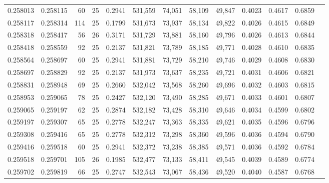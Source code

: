 \begin{tabular}{rrrrrrrrrrrrr}
0.258013 & 0.258115 &    60 &  25 &                                     0.2941 & 531,559 &  74,051 &  58,109 &  49,847 & 0.4023 & 0.4617 & 0.6859 \\
0.258117 & 0.258314 &   114 &  25 &                                     0.1799 & 531,673 &  73,937 &  58,134 &  49,822 & 0.4026 & 0.4615 & 0.6849 \\
0.258318 & 0.258417 &    56 &  26 &                                     0.3171 & 531,729 &  73,881 &  58,160 &  49,796 & 0.4026 & 0.4613 & 0.6844 \\
0.258418 & 0.258559 &    92 &  25 &                                     0.2137 & 531,821 &  73,789 &  58,185 &  49,771 & 0.4028 & 0.4610 & 0.6835 \\
0.258564 & 0.258697 &    60 &  25 &                                     0.2941 & 531,881 &  73,729 &  58,210 &  49,746 & 0.4029 & 0.4608 & 0.6830 \\
0.258697 & 0.258829 &    92 &  25 &                                     0.2137 & 531,973 &  73,637 &  58,235 &  49,721 & 0.4031 & 0.4606 & 0.6821 \\
0.258831 & 0.258948 &    69 &  25 &                                     0.2660 & 532,042 &  73,568 &  58,260 &  49,696 & 0.4032 & 0.4603 & 0.6815 \\
0.258953 & 0.259065 &    78 &  25 &                                     0.2427 & 532,120 &  73,490 &  58,285 &  49,671 & 0.4033 & 0.4601 & 0.6807 \\
0.259065 & 0.259197 &    62 &  25 &                                     0.2874 & 532,182 &  73,428 &  58,310 &  49,646 & 0.4034 & 0.4599 & 0.6802 \\
0.259197 & 0.259307 &    65 &  25 &                                     0.2778 & 532,247 &  73,363 &  58,335 &  49,621 & 0.4035 & 0.4596 & 0.6796 \\
0.259308 & 0.259416 &    65 &  25 &                                     0.2778 & 532,312 &  73,298 &  58,360 &  49,596 & 0.4036 & 0.4594 & 0.6790 \\
0.259416 & 0.259518 &    60 &  25 &                                     0.2941 & 532,372 &  73,238 &  58,385 &  49,571 & 0.4036 & 0.4592 & 0.6784 \\
0.259518 & 0.259701 &   105 &  26 &                                     0.1985 & 532,477 &  73,133 &  58,411 &  49,545 & 0.4039 & 0.4589 & 0.6774 \\
0.259702 & 0.259819 &    66 &  25 &                                     0.2747 & 532,543 &  73,067 &  58,436 &  49,520 & 0.4040 & 0.4587 & 0.6768 \\

\end{tabular}
